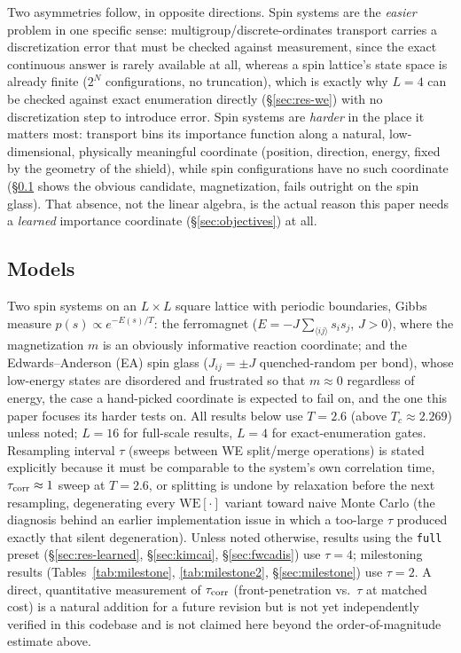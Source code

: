 \documentclass[a4paper,fleqn]{cas-sc}
\begin{document}
Two asymmetries follow, in opposite directions. Spin systems are the \emph{easier} problem
in one specific sense: multigroup/discrete-ordinates transport carries a discretization
error that must be checked against measurement, since the exact continuous answer is rarely
available at all, whereas a spin lattice's state space is already finite
($2^N$ configurations, no truncation), which is exactly why $L=4$ can be checked against
exact enumeration directly (\S\ref{sec:res-we}) with no discretization step to introduce
error. Spin systems are \emph{harder} in the place it matters most: transport bins its
importance function along a natural, low-dimensional, physically meaningful coordinate
(position, direction, energy, fixed by the geometry of the shield), while spin
configurations have no such coordinate (\S\ref{sec:models} shows the obvious candidate,
magnetization, fails outright on the spin glass). That absence, not the linear algebra, is
the actual reason this paper needs a \emph{learned} importance coordinate
(\S\ref{sec:objectives}) at all.

\FloatBarrier

\subsection{Models}\label{sec:models}
Two spin systems on an $L\times L$ square lattice with periodic boundaries, Gibbs measure
$p(s)\propto e^{-E(s)/T}$: the ferromagnet ($E=-J\sum_{\langle ij\rangle}s_is_j$,
$J>0$), where the magnetization $m$ is an obviously informative reaction coordinate; and
the Edwards--Anderson (EA) spin glass ($J_{ij}=\pm J$ quenched-random per bond),
whose low-energy states are disordered and frustrated so that $m\approx 0$ regardless of
energy, the case a hand-picked coordinate is expected to fail on, and the one this paper
focuses its harder tests on. All results below use $T=2.6$ (above $T_c\approx2.269$) unless
noted; $L=16$ for full-scale results, $L=4$ for exact-enumeration gates. Resampling
	interval $\tau$ (sweeps between WE split/merge operations) is stated explicitly because it
must be comparable to the system's own correlation time, $\tau_{\rm corr}\approx1$ sweep at
$T=2.6$, or splitting is undone by relaxation before the next resampling, degenerating every
$\mathrm{WE}[\cdot]$ variant toward naive Monte Carlo (the diagnosis behind an earlier
implementation issue in which a too-large $\tau$ produced exactly that silent degeneration).
Unless noted otherwise, results using the \texttt{full} preset (\S\ref{sec:res-learned},
\S\ref{sec:kimcai}, \S\ref{sec:fwcadis}) use $\tau=4$; milestoning results
(Tables~\ref{tab:milestone}, \ref{tab:milestone2}, \S\ref{sec:milestone}) use $\tau=2$. A
direct, quantitative measurement of $\tau_{\rm corr}$ (front-penetration vs.\ $\tau$ at
matched cost) is a natural addition for a future revision but is not yet independently
verified in this codebase and is not claimed here beyond the order-of-magnitude estimate
above.
\end{document}
